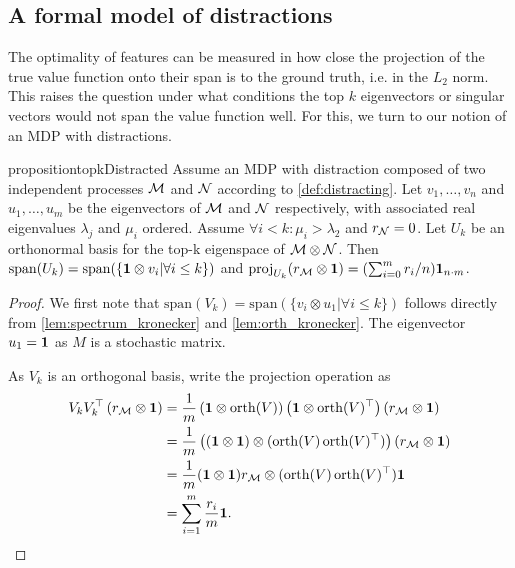 \subsection{A formal model of distractions}
\label{app:distraction_motivation}

The optimality of features can be measured in how close the projection of the true value function onto their span is to the ground truth, i.e. in the $L_2$ norm.
This raises the question under what conditions the top $k$ eigenvectors or singular vectors would not span the value function well.
For this, we turn to our notion of an MDP with distractions.

\begin{restatable}{proposition}{topkDistracted} \label{prop:SubptimalTopKProduct} Assume an MDP with distraction composed of two independent processes ${\mathcal{M}}$ and ${\mathcal{N}}$ according to \cref{def:distracting}.
Let $v_1,\dots,v_n$ and $u_1,\dots,u_m$ be the eigenvectors of ${\mathcal{M}}$ and ${\mathcal{N}}$ respectively, with associated real eigenvalues $\lambda_j$ and $\mu_i$ ordered.
Assume $\forall i < k: \mu_i > \lambda_2$ and $r_{\mathcal{N}} = 0$.
Let $U_k$ be an orthonormal basis for the top-k eigenspace of ${\mathcal{M}} \otimes {\mathcal{N}}$.
Then $\mathrm{span}(U_k) = \mathrm{span}(\{{\bm{1}} \otimes v_i|\forall i \leq k\})$ and $\mathrm{proj}_{U_k}(r_{\mathcal{M}} \otimes {\bm{1}}) = (\sum_{i=0}^m r_i / n) {\bm{1}}_{n\cdot m}$.
\end{restatable}
\begin{proof}
We first note that $\mathrm{span}(V_k) = \mathrm{span}(\{v_i\otimes u_1|\forall i \leq k\})$ follows directly from \autoref{lem:spectrum_kronecker} and \autoref{lem:orth_kronecker}. The eigenvector $u_1 = {\bm{1}}$ as $M$ is a stochastic matrix.

As $V_k$ is an orthogonal basis, write the projection operation as 
\begin{align*}
V_k V_k^\top \left(r_{\mathcal{M}} \otimes {\bm{1}}\right) &= \frac{1}{m}\left({\bm{1}} \otimes \mathrm{orth}(V)\right)\left({\bm{1}} \otimes \mathrm{orth}(V)^\top \right)\left(r_{\mathcal{M}} \otimes {\bm{1}}\right) \\
&= \frac{1}{m}\left(({\bm{1}} \otimes {\bm{1}}) \otimes (\mathrm{orth}(V)\,\mathrm{orth}(V)^\top)\right) (r_{\mathcal{M}} \otimes {\bm{1}})\\
&= \frac{1}{m}({\bm{1}} \otimes {\bm{1}}) r_{\mathcal{M}} \otimes (\mathrm{orth}(V)\,\mathrm{orth}(V)^\top) {\bm{1}} \\
&= \sum_{i=1}^m \frac{r_i}{m}{\bm{1}}.
\end{align*}

\end{proof}


